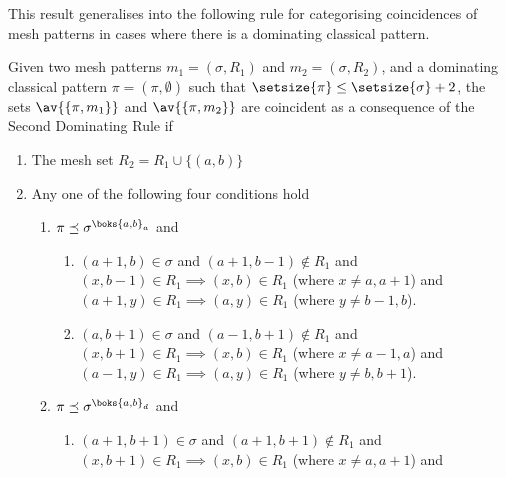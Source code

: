 This result generalises into the following rule for categorising coincidences
of mesh patterns in cases where there is a dominating classical pattern.

\begin{proposition}
    \label{prop:dom2}
    Given two mesh patterns \(m_1 =(\sigma, R_1)\) and \(m_2 = (\sigma, R_2)\),
    and a dominating classical pattern \(\pi = (\pi,\emptyset)\) such that
    \(\setsize{\pi} \le \setsize{\sigma} + 2\), the sets \(\av{\{\pi,m_1\}}\) and
    \(\av{\{\pi,m_2\}}\) are coincident as a consequence of the Second Dominating Rule if

    \begin{enumerate}
        \item The mesh set \(R_2 = R_1 \cup \{(a,b)\}\)
        \item\label{prop:dom2:cond} Any one of the following four conditions hold \begin{enumerate}
                \item\label{prop:dom2:condc} \(\pi \preceq \sigma^{\boks{a,b}_a}\) and
                        \begin{enumerate}
                            \item \((a+1,b) \in \sigma\) and \((a+1,b-1)\notin R_1\) and \\
                                \((x,b-1)\in R_1 \implies (x,b) \in R_1 \) (where \(x\neq a,a+1\)) and\\
                                  \((a+1,y)\in R_1 \implies (a,y) \in R_1\) (where \(y\neq b-1,b\)).
                            \item \((a,b+1) \in \sigma\) and \((a-1,b+1)\notin R_1\) and \\
                                  \((x,b+1)\in R_1 \implies (x,b) \in R_1\) (where \(x\neq a-1,a\)) and\\
                                  \((a-1,y)\in R_1 \implies (a,y) \in R_1\) (where \(y\neq b,b+1\)).
                        \end{enumerate}
                    \item \(\pi \preceq \sigma^{\boks{a,b}_d}\) and
                        \begin{enumerate}
                            \item \((a+1,b+1) \in \sigma\) and \((a+1,b+1)\notin R_1\) and \\
                                  \((x,b+1)\in R_1 \implies (x,b) \in R_1\) (where \(x\neq a,a+1\)) and\\

\end{enumerate}
\end{enumerate}
\end{enumerate}
\end{proposition}
